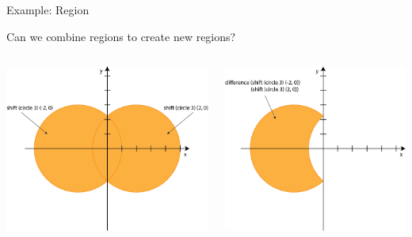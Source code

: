 \documentclass[8pt,aspectratio=169]{beamer}
\begin{document}
\begin{frame}[fragile]{Example: Region}

Can we combine regions to create new regions?

\begin{columns}[onlytextwidth]
\begin{column}{0.5\textwidth}
\pause
\begin{center}
\includegraphics[scale=0.22]{figures/diffRegion1}
\end{center}
\end{column}
\begin{column}{0.5\textwidth}
\pause
\begin{center}
\includegraphics[scale=0.22]{figures/diffRegion2}
\end{center}
\end{column}
\end{columns}


\end{frame}
\end{document}
